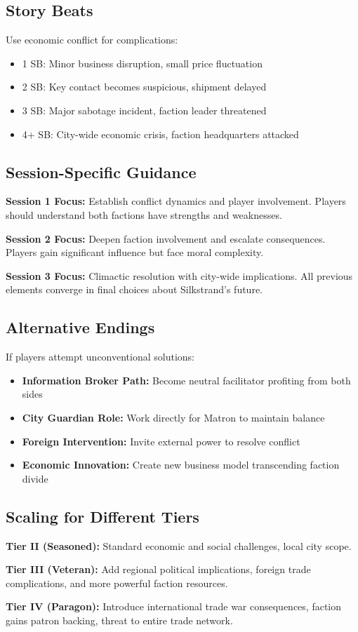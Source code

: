 \documentclass[11pt]{article}
\begin{document}
\subsection{Story Beats}
Use economic conflict for complications:
\begin{itemize}
\item 1 SB: Minor business disruption, small price fluctuation
\item 2 SB: Key contact becomes suspicious, shipment delayed
\item 3 SB: Major sabotage incident, faction leader threatened
\item 4+ SB: City-wide economic crisis, faction headquarters attacked
\end{itemize}

\subsection{Session-Specific Guidance}

\textbf{Session 1 Focus:} Establish conflict dynamics and player involvement. Players should understand both factions have strengths and weaknesses.

\textbf{Session 2 Focus:} Deepen faction involvement and escalate consequences. Players gain significant influence but face moral complexity.

\textbf{Session 3 Focus:} Climactic resolution with city-wide implications. All previous elements converge in final choices about Silkstrand's future.

\subsection{Alternative Endings}

If players attempt unconventional solutions:
\begin{itemize}
\item \textbf{Information Broker Path:} Become neutral facilitator profiting from both sides
\item \textbf{City Guardian Role:} Work directly for Matron to maintain balance
\item \textbf{Foreign Intervention:} Invite external power to resolve conflict
\item \textbf{Economic Innovation:} Create new business model transcending faction divide
\end{itemize}

\subsection{Scaling for Different Tiers}

\textbf{Tier II (Seasoned):} Standard economic and social challenges, local city scope.

\textbf{Tier III (Veteran):} Add regional political implications, foreign trade complications, and more powerful faction resources.

\textbf{Tier IV (Paragon):} Introduce international trade war consequences, faction gains patron backing, threat to entire trade network.
\end{document}
